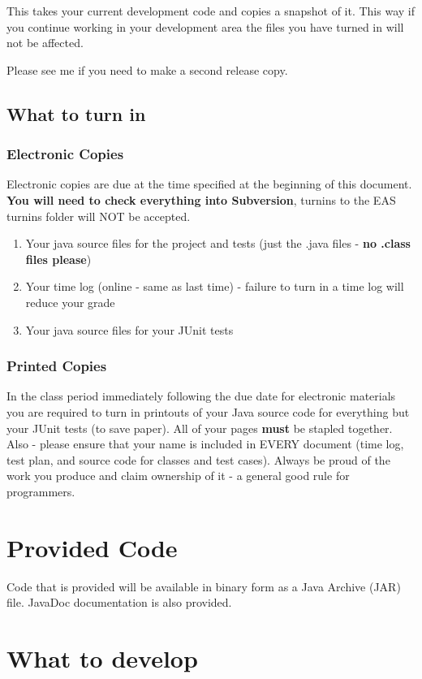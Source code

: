 \documentclass[10pt]{exam}
\begin{document}
This takes your current development code and copies a snapshot of it.   This way if you continue working in your development area the files you have turned in will not be affected.
\par
Please see me if you need to make a second release copy.

\subsection{What to turn in}
\subsubsection{Electronic Copies}
Electronic copies are due at the time specified at the beginning of this document.  {\bf You will need to check everything into Subversion}, turnins to the EAS turnins folder will NOT be accepted.
\begin{enumerate}
   \item Your java source files for the project and tests (just the .java files - {\bf no .class files please})
   \item Your time log (online - same as last time) - failure to turn in a time log will reduce your grade
   \item Your java source files for your JUnit tests
\end{enumerate}

\subsubsection{Printed Copies}
In the class period immediately following the due date for electronic materials you are required to turn in printouts of your Java source code for everything but your JUnit tests (to save paper).  All of your pages {\bf must} be stapled together.  
\newline
Also - please ensure that your name is included in EVERY document (time log, test plan, and source code for classes and test cases).  Always be proud of the work you produce and claim ownership of it - a general good rule for programmers.

\section{Provided Code}
Code that is provided will be available in binary form as a Java Archive (JAR) file.   JavaDoc documentation is also provided.  

\section{What to develop}
\end{document}
